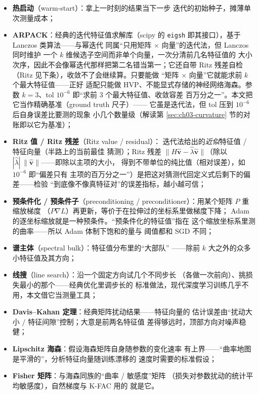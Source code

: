 \begin{itemize}
        （\texttt{create\_graph=True}）。因为海森有参数量平方个
        元素、存不下，这种``只算 $Hv$、不存 $H$''的技巧是全部
        曲率测量的基本开销单位；
  \item \textbf{热启动}（warm-start）：拿上一时刻的结果当下一步
        迭代的初始种子，摊薄单次测量成本；
  \item \textbf{ARPACK}：经典的迭代特征值求解库（scipy 的
        \texttt{eigsh} 即其接口），基于 Lanczos 类算法——与幂迭代
        同属``只用矩阵 $\times$ 向量''的迭代法，但 Lanczos 同时维护
        一个 $k$ 维候选子空间而非单个向量，一次分清前几名特征值的
        大小次序，因此不会像幂迭代那样把第二名错当第一；它还自带
        Ritz 残差自检（Ritz 见下条），收敛不了会继续算。只要能做
        ``矩阵 $\times$ 向量''它就能求前 $k$ 个最大特征值——正好
        适配只能做 HVP、不能显式存储的神经网络海森。参数
        $k{=}3$、tol $10^{-6}$ 即``求前 3 个最大特征值、收敛容差
        百万分之一''。本文把它当作精确基准（ground truth 尺子）——
        它虽是迭代法，但 tol 压到 $10^{-6}$ 后自身误差比要测的现象
        小几个数量级（解读第
        \ref{sec:ch03-curvature} 节的对账即以它为基准）；
  \item \textbf{Ritz 值 / Ritz 残差}（Ritz value / residual）：
        迭代法给出的\emph{近似}特征值 / 特征向量（半路上的当前最佳
        猜测）；Ritz 残差
        $\|H\hat{\mathbf{v}}-\hat\lambda\hat{\mathbf{v}}\|$（除以
        $|\hat\lambda|\,\|\hat{\mathbf{v}}\|$——即除以主项的大小，
        得到不带单位的纯比值（相对误差），如 $10^{-6}$ 即``偏差只有
        主项的百万分之一''）是把这对猜测代回定义式后剩下的偏差——检验
        ``到底像不像真特征对''的误差指标，越小越可信；
  \item \textbf{预条件化 / 预条件子}（preconditioning /
        preconditioner）：用某个矩阵 $P$ 重缩放梯度
        （$P\nabla L$）再更新，等价于在拉伸过的坐标系里做梯度下降；
        Adam 的逐坐标缩放就是一种预条件。``预条件化的特征值''指在
        这个缩放坐标系里测的曲率——所以 Adam 体制下饱和的量与
        阈值都和 SGD 不同；
  \item \textbf{谱主体}（spectral bulk）：特征值分布里的``大部队''
        ——除前 $k$ 大之外的众多小特征值及其方向；
  \item \textbf{线搜}（line search）：沿一个固定方向试几个不同步长
        （各做一次前向）、挑损失最小的那个——经典优化里调步长的
        标准做法，现代深度学习训练几乎不用，本文借它当测量工具；
  \item \textbf{Davis--Kahan 定理}：经典矩阵扰动结果——特征向量的
        估计误差由``扰动大小 $/$ 特征间隙''控制；大意是前两名特征值
        差得够远时，顶部方向对噪声稳健；
  \item \textbf{Lipschitz 海森}：假设海森矩阵自身随参数的变化速率
        有上界——``曲率地图是平滑的''，分析特征向量随训练漂移的
        速度时需要的标准假设；
  \item \textbf{Fisher 矩阵}：与海森同族的``曲率 / 敏感度''矩阵
        （损失对参数扰动的统计平均敏感度），自然梯度与 K-FAC 用的
        就是它。
\end{itemize}

